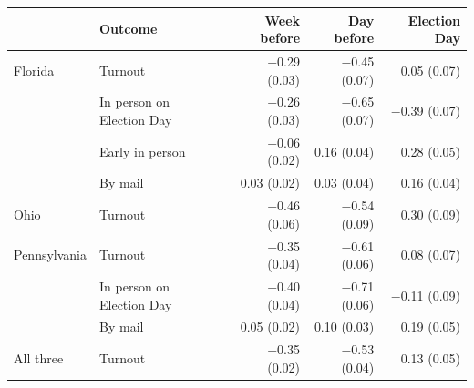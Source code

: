 \begin{tabular}{llrrr}
\toprule
 & Outcome & Week before & Day before & Election Day \\
\midrule
Florida & Turnout & $-$0.29 (0.03) & $-$0.45 (0.07) & 0.05 (0.07) \\
 & In person on Election Day & $-$0.26 (0.03) & $-$0.65 (0.07) & $-$0.39 (0.07) \\
 & Early in person & $-$0.06 (0.02) & 0.16 (0.04) & 0.28 (0.05) \\
 & By mail & 0.03 (0.02) & 0.03 (0.04) & 0.16 (0.04) \\
Ohio & Turnout & $-$0.46 (0.06) & $-$0.54 (0.09) & 0.30 (0.09) \\
Pennsylvania & Turnout & $-$0.35 (0.04) & $-$0.61 (0.06) & 0.08 (0.07) \\
 & In person on Election Day & $-$0.40 (0.04) & $-$0.71 (0.06) & $-$0.11 (0.09) \\
 & By mail & 0.05 (0.02) & 0.10 (0.03) & 0.19 (0.05) \\
All three & Turnout & $-$0.35 (0.02) & $-$0.53 (0.04) & 0.13 (0.05) \\
\bottomrule
\end{tabular}
